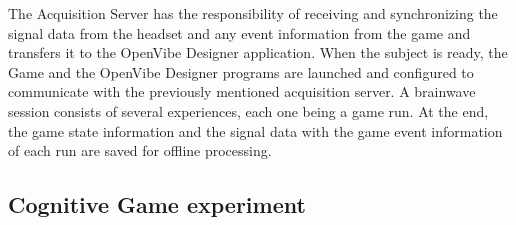 \documentclass[journal]{IEEEtran}
\begin{document}
The Acquisition Server has the responsibility of receiving and synchronizing the signal data from the headset and any event information from the game and transfers it to the OpenVibe Designer application. When the subject is ready, the Game and the OpenVibe Designer programs are launched and configured to communicate with the previously mentioned acquisition server. A brainwave session consists of several experiences, each one being a game run.  At the end, the game state information and the signal data with the game event information of each run are saved for offline processing.


\subsection{Cognitive Game experiment}
\label{cognitive_experiment_details}
\end{document}
